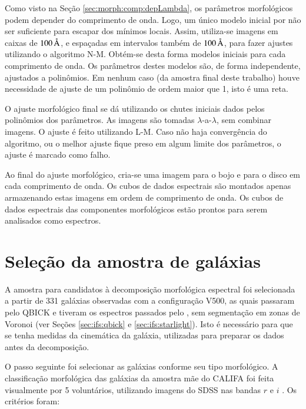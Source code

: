 Como visto na Seção \ref{sec:morph:comp:depLambda}, os parâmetros morfológicos
podem depender do comprimento de onda. Logo, um único modelo inicial por não ser
suficiente para escapar dos mínimos locais. Assim, utiliza-se imagens em caixas
de $100\,\text{\normalfont\AA}$, e espaçadas em intervalos também de $100\,\text{\normalfont\AA}$, para
fazer ajustes utilizando o algoritmo N-M. Obtém-se desta forma modelos iniciais
para cada comprimento de onda. Os parâmetros destes modelos são, de forma
independente, ajustados a polinômios. Em nenhum caso (da amostra final deste
trabalho) houve necessidade de ajuste de um polinômio de ordem maior que 1, isto
é uma reta.

O ajuste morfológico final se dá utilizando os chutes iniciais dados pelos
polinômios dos parâmetros. As imagens são tomadas $\lambda$-a-$\lambda$, sem
combinar imagens. O ajuste é feito utilizando L-M. Caso não haja convergência do
algoritmo, ou o melhor ajuste fique preso em algum limite dos parâmetros, o
ajuste é marcado como falho.

Ao final do ajuste morfológico, cria-se uma imagem para o bojo e para o disco em
cada comprimento de onda. Os cubos de dados espectrais são montados apenas
armazenando estas imagens em ordem de comprimento de onda. Os cubos de dados
espectrais das componentes morfológicos estão prontos para serem analisados como
espectros.



\section{Seleção da amostra de galáxias}

A amostra para candidatos à decomposição morfológica espectral foi selecionada a
partir de 331 galáxias observadas com a configuração V500, as quais passaram
pelo QBICK e tiveram os espectros passados pelo \starlight, sem segmentação em
zonas de Voronoi (ver Seções \ref{sec:ifs:qbick} e \ref{sec:ifs:starlight}).
Isto é necessário para que se tenha medidas da cinemática da galáxia, utilizadas
para preparar os dados antes da decomposição.

O passo seguinte foi selecionar as galáxias conforme seu tipo morfológico. A
classificação morfológica das galáxias da amostra mãe do CALIFA foi feita
visualmente por 5 voluntários, utilizando imagens do SDSS nas bandas $r$ e $i$
\citep{Walcher2014}. Os critérios foram:

